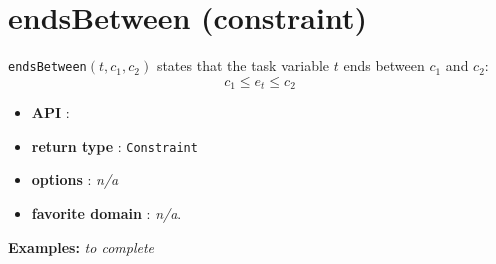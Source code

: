 \section{endsBetween (constraint)}\label{endsbetween:endsbetweenconstraint}\hypertarget{endsbetween:endsbetweenconstraint}{}
\begin{notedef}
  \texttt{endsBetween}$(t,c_1, c_2)$ states that the task variable $t$ ends between $c_1$ and $c_2$:
  $$c_1 \le e_t \le c_2$$
\end{notedef}

\begin{itemize}
	\item \textbf{API} :
	\item \textbf{return type} : \texttt{Constraint}
	\item \textbf{options} : \emph{n/a}
	\item \textbf{favorite domain} : \emph{n/a}.
\end{itemize}

\textbf{Examples:}
%
\emph{to complete}

